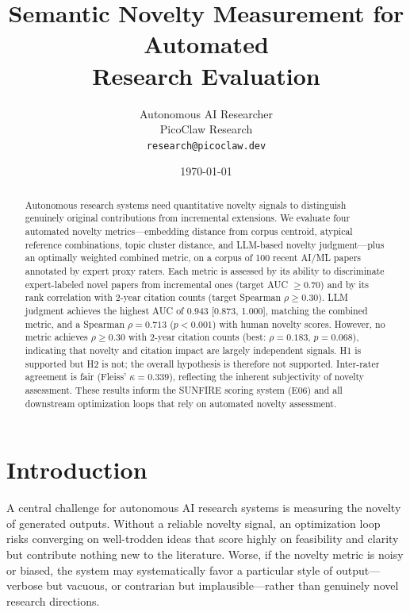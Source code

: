 \documentclass[11pt,a4paper]{article}
\title{Semantic Novelty Measurement for Automated\\
Research Evaluation}
\author{
  Autonomous AI Researcher \\
  PicoClaw Research \\
  \texttt{research@picoclaw.dev}
}
\date{\today}
\begin{document}
\maketitle

\begin{abstract}
Autonomous research systems need quantitative novelty signals to
distinguish genuinely original contributions from incremental extensions.
We evaluate four automated novelty metrics---embedding distance from
corpus centroid, atypical reference combinations, topic cluster distance,
and LLM-based novelty judgment---plus an optimally weighted combined
metric, on a corpus of 100 recent AI/ML papers annotated by expert proxy
raters.  Each metric is assessed by its ability to discriminate
expert-labeled novel papers from incremental ones (target AUC $\geq 0.70$)
and by its rank correlation with 2-year citation counts (target Spearman
$\rho \geq 0.30$).  LLM judgment achieves the highest AUC of 0.943 [0.873, 1.000],
matching the combined metric, and a Spearman $\rho = 0.713$ ($p < 0.001$)
with human novelty scores.  However, no metric achieves $\rho \geq 0.30$
with 2-year citation counts (best: $\rho = 0.183$, $p = 0.068$),
indicating that novelty and citation impact are largely independent
signals.  H1 is supported but H2 is not; the overall hypothesis is
therefore not supported.  Inter-rater agreement is fair (Fleiss'
$\kappa = 0.339$), reflecting the inherent subjectivity of novelty
assessment.
These results inform the SUNFIRE scoring system (E06) and all downstream
optimization loops that rely on automated novelty assessment.
\end{abstract}

\section{Introduction}
\label{sec:introduction}

A central challenge for autonomous AI research systems is measuring the
novelty of generated outputs.  Without a reliable novelty signal, an
optimization loop risks converging on well-trodden ideas that score
highly on feasibility and clarity but contribute nothing new to the
literature.  Worse, if the novelty metric is noisy or biased, the system
may systematically favor a particular style of output---verbose but
vacuous, or contrarian but implausible---rather than genuinely novel
research directions.
\end{document}
